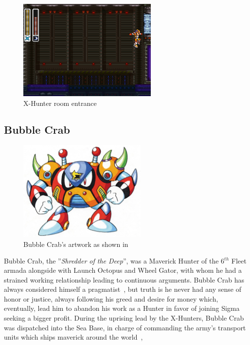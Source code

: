 \begin{figure}[htp]
	\centering
	\includegraphics[height=5cm]{figures/X2/Bubble_crab/Crab_Hunter_room.png}
	\caption{X-Hunter room entrance}
\end{figure}

\subsection{Bubble Crab}\label{boss:Bubble_crab}
\begin{figure}[htp]
	\centering
	\includegraphics[height=5cm]{figures/X2/Bubble_crab/Bubble_Crab.png}
	\caption{Bubble Crab's artwork as shown in \cite{book:MMX_Complete_art}}
\end{figure}
Bubble Crab, the ''\textit{Shredder of the Deep}'', was a Maverick Hunter of the 6$^{th}$ Fleet armada alongside with Launch Octopus and Wheel Gator, with whom he had a strained working relationship leading to continuous arguments. Bubble Crab has always considered himself a pragmatist~\cite{Xcoll1:Manual_X2}, but truth is he never had any sense of honor or justice, always following his greed and desire for money which, eventually, lead him to abandon his work as a Hunter in favor of joining Sigma seeking a bigger profit. During the uprising lead by the X-Hunters, Bubble Crab was dispatched into the Sea Base, in charge of commanding the army's transport units which ships maverick around the world~\cite{wiki:Bubble_Crab}, \cite{wayback:X2_resources}

